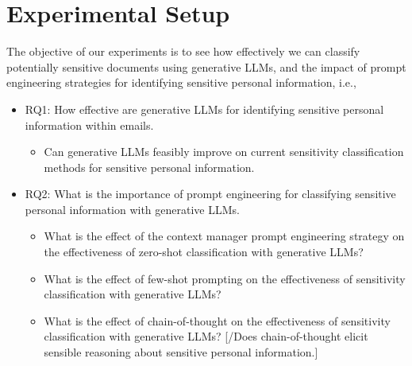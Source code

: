 \section{Experimental Setup}

The objective of our experiments is to see how effectively we can classify potentially sensitive documents using generative LLMs, and the impact of prompt engineering strategies for identifying sensitive personal information, i.e.,
\begin{itemize}
    \item RQ1: How effective are generative LLMs for identifying sensitive personal information within emails.
    \begin{itemize}
    \item Can generative LLMs feasibly improve on current sensitivity classification methods for sensitive personal information.
    \end{itemize}
    \item RQ2: What is the importance of prompt engineering for classifying sensitive personal information with generative LLMs.
    \begin{itemize}
    \item What is the effect of the context manager prompt engineering strategy on the effectiveness of zero-shot classification with generative LLMs?
    \item What is the effect of few-shot prompting on the effectiveness of sensitivity classification with generative LLMs?
    \item What is the effect of chain-of-thought on the effectiveness of sensitivity classification with generative LLMs? [/Does chain-of-thought elicit sensible reasoning about sensitive personal information.]
    \end{itemize}
\end{itemize}

